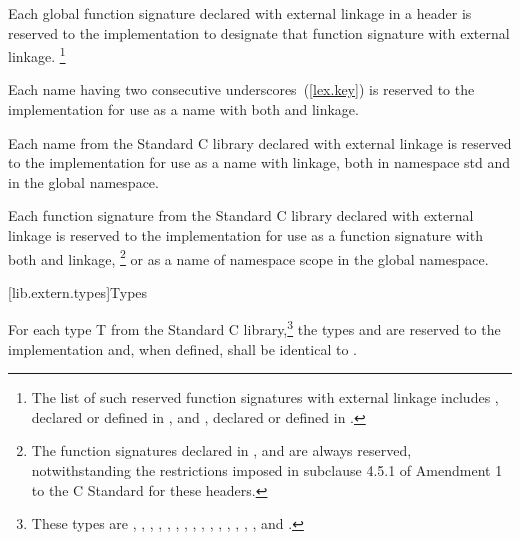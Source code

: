 \pnum
Each
%
global function signature declared with
%
external linkage in a header is reserved to the
implementation to designate that function signature with
%
external linkage.
\footnote{The list of such reserved function
signatures with external linkage includes
%
,
declared or defined in
%
,
and
%
%
,
declared or defined in
%
.}

\pnum
Each name having two consecutive underscores~(\ref{lex.key}) is reserved
to the implementation for use as a name with both
%
and
%
 linkage.

\pnum
Each name from the Standard C library declared with external linkage
%
is reserved to the implementation for use as a name with
%
%
linkage,
both in namespace std and in the global namespace.

\pnum
Each function signature from the Standard C library declared with
%
external linkage
is reserved to the implementation for use as
a function signature with both
%
and
%
linkage,
\footnote{
The function
signatures declared in
%
%
%
%
,
and
are always reserved, notwithstanding the restrictions imposed in subclause
4.5.1 of Amendment 1 to the C Standard for these headers.}
or as a name of namespace scope in the global namespace.

[lib.extern.types]{Types}

\pnum
For each type T from the Standard C library,\footnote{These types are
,
,
,
,
,
,
,
,
,
,
,
,
,
,
,
and
.}
the types
and
are reserved to the implementation and, when defined,
shall be identical to
.

